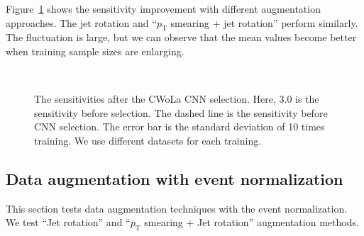 \documentclass[12pt]{article}
\begin{document}
        Figure~\ref{fig:sensitivity_improvement_aug_SB_3_image_norm} shows the sensitivity improvement with different augmentation approaches. The jet rotation and ``$p_{\text{T}}$ smearing + jet rotation'' perform similarly. The fluctuation is large, but we can observe that the mean values become better when training sample sizes are enlarging.
        \begin{figure}[htpb]
            \centering
             \\
            \caption{The sensitivities after the CWoLa CNN selection. Here, $3.0$ is the sensitivity before selection. The dashed line is the sensitivity before CNN selection. The error bar is the standard deviation of 10 times training. We use different datasets for each training.}
            \label{fig:sensitivity_improvement_aug_SB_3_image_norm}
        \end{figure}
    \subsection{Data augmentation with event normalization}%
    \label{sub:data_augmentation_with_event_normalization}
        This section tests data augmentation techniques with the event normalization. We test ``Jet rotation'' and ``$p_{\text{T}}$ smearing + Jet rotation'' augmentation methods.
\end{document}
